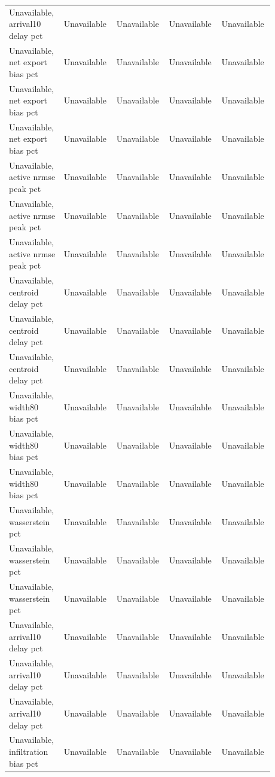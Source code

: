 \begin{longtable}{p{0.1760\linewidth}p{0.1760\linewidth}p{0.1760\linewidth}p{0.1760\linewidth}p{0.1760\linewidth}}
Unavailable, arrival10 delay pct & Unavailable & Unavailable & Unavailable & Unavailable \\
Unavailable, net export bias pct & Unavailable & Unavailable & Unavailable & Unavailable \\
Unavailable, net export bias pct & Unavailable & Unavailable & Unavailable & Unavailable \\
Unavailable, net export bias pct & Unavailable & Unavailable & Unavailable & Unavailable \\
Unavailable, active nrmse peak pct & Unavailable & Unavailable & Unavailable & Unavailable \\
Unavailable, active nrmse peak pct & Unavailable & Unavailable & Unavailable & Unavailable \\
Unavailable, active nrmse peak pct & Unavailable & Unavailable & Unavailable & Unavailable \\
Unavailable, centroid delay pct & Unavailable & Unavailable & Unavailable & Unavailable \\
Unavailable, centroid delay pct & Unavailable & Unavailable & Unavailable & Unavailable \\
Unavailable, centroid delay pct & Unavailable & Unavailable & Unavailable & Unavailable \\
Unavailable, width80 bias pct & Unavailable & Unavailable & Unavailable & Unavailable \\
Unavailable, width80 bias pct & Unavailable & Unavailable & Unavailable & Unavailable \\
Unavailable, width80 bias pct & Unavailable & Unavailable & Unavailable & Unavailable \\
Unavailable, wasserstein pct & Unavailable & Unavailable & Unavailable & Unavailable \\
Unavailable, wasserstein pct & Unavailable & Unavailable & Unavailable & Unavailable \\
Unavailable, wasserstein pct & Unavailable & Unavailable & Unavailable & Unavailable \\
Unavailable, arrival10 delay pct & Unavailable & Unavailable & Unavailable & Unavailable \\
Unavailable, arrival10 delay pct & Unavailable & Unavailable & Unavailable & Unavailable \\
Unavailable, arrival10 delay pct & Unavailable & Unavailable & Unavailable & Unavailable \\
Unavailable, infiltration bias pct & Unavailable & Unavailable & Unavailable & Unavailable \\

\end{longtable}
